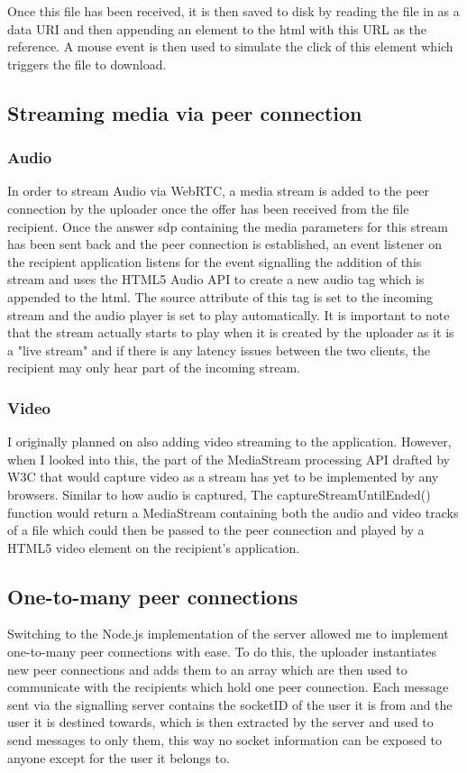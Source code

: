 \documentclass[]{report}
\begin{document}
			Once this file has been received, it is then saved to disk by reading the file in as a data URI and then appending an element to the html with this URL as the reference. A mouse event is then used to simulate the click of this element which triggers the file to download. 
			
			\subsection{Streaming media via peer connection}
				\subsubsection{Audio}
				In order to stream Audio via WebRTC, a media stream is added to the peer connection by the uploader once the offer has been received from the file recipient. Once the answer sdp containing the media parameters for this stream has been sent back and the peer connection is established, an event listener on the recipient application listens for the event signalling the addition of this stream and uses the HTML5 Audio API to create a new audio tag which is appended to the html. The source attribute of this tag is set to the incoming stream and the audio player is set to play automatically. It is important to note that the stream actually starts to play when it is created by the uploader as it is a "live stream" and if there is any latency issues between the two clients, the recipient may only hear part of the incoming stream.

				\subsubsection{Video}
				I originally planned on also adding video streaming to the application. However, when I looked into this, the part of the MediaStream processing API drafted by W3C that would capture video as a stream has yet to be implemented by any browsers. Similar to how audio is captured, The captureStreamUntilEnded() function would return a MediaStream containing both the audio and video tracks of a file which could then be passed to the peer connection and played by a HTML5 video element on the recipient's application.
			
			\subsection{One-to-many peer connections}
			Switching to the Node.js implementation of the server allowed me to implement one-to-many peer connections with ease. To do this, the uploader instantiates new peer connections and adds them to an array which are then used to communicate with the recipients which hold one peer connection. Each message sent via the signalling server contains the socketID of the user it is from and the user it is destined towards, which is then extracted by the server and used to send messages to only them, this way no socket information can be exposed to anyone except for the user it belongs to. 
			
\end{document}
